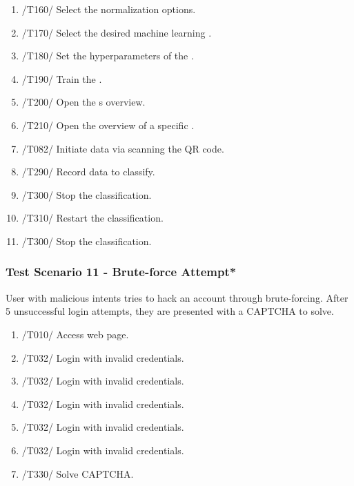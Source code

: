 \begin{enumerate}
    \item /T160/ Select the normalization options.
    \item /T170/ Select the desired machine learning .
    \item /T180/ Set the hyperparameters of the .
    \item /T190/ Train the .
    \item /T200/ Open the s overview. 
    \item /T210/ Open the overview of a specific .
    \item /T082/ Initiate data via scanning the \gls{QR code}.
    \item /T290/ Record data to classify. 
    \item /T300/ Stop the \gls{classification}.
    \item /T310/ Restart the \gls{classification}.
    \item /T300/ Stop the \gls{classification}.
\end{enumerate}

\subsubsection{Test Scenario 11 - Brute-force Attempt*}
User with malicious intents tries to hack an account through brute-forcing. After 5 unsuccessful login attempts, they are presented with a \gls{CAPTCHA} to solve.
\begin{enumerate}
    \item /T010/ Access web page.
    \item /T032/ Login with invalid credentials.
    \item /T032/ Login with invalid credentials.
    \item /T032/ Login with invalid credentials.
    \item /T032/ Login with invalid credentials.
    \item /T032/ Login with invalid credentials.
    \item /T330/ Solve \gls{CAPTCHA}.
\end{enumerate}
